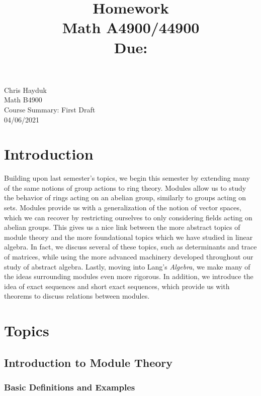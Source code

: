 \documentclass[11pt, reqno]{amsart}
\title[Homework \HW]{Homework \HW \\
Math A4900/44900\\
\small Due: \DUE}
\author{}
\theoremstyle{plain}
\theoremstyle{definition}
\theoremstyle{example}
\def\DUE{04/06/2021}
\begin{document}
\begin{flushright}
Chris Hayduk\\
Math B4900\\
Course Summary: First Draft\\
\DUE
\end{flushright}

\section{Introduction}

Building upon last semester's topics, we begin this semester by extending many of the same notions of group actions to ring theory. Modules allow us to study the behavior of rings acting on an abelian group, similarly to groups acting on sets. Modules provide us with a generalization of the notion of vector spaces, which we can recover by restricting ourselves to only considering fields acting on abelian groups. This gives us a nice link between the more abstract topics of module theory and the more foundational topics which we have studied in linear algebra. In fact, we discuss several of these topics, such as determinants and trace of matrices, while using the more advanced machinery developed throughout our study of abstract algebra. Lastly, moving into Lang's \textit{Algebra}, we make many of the ideas surrounding modules even more rigorous. In addition, we introduce the idea of exact sequences and short exact sequences, which provide us with theorems to discuss relations between modules.

\newpage

\section{Topics}

\subsection{Introduction to Module Theory}

\subsubsection{Basic Definitions and Examples}
\end{document}
